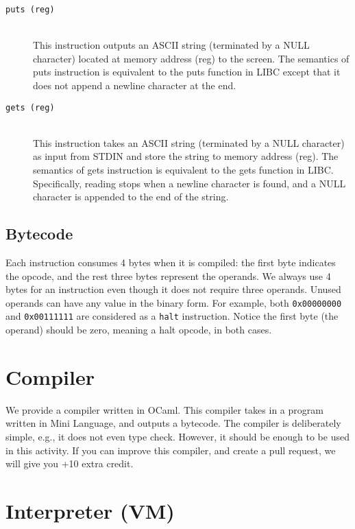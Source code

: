 \documentclass[a4paper, 11pt]{article}
\theoremstyle{definition}
\begin{document}
{\begin{description}
  \item [\texttt{puts (reg)}]~\\
    This instruction outputs an ASCII string (terminated by a NULL
    character) located at memory address (reg) to the screen. The
    semantics of puts instruction is equivalent to the puts function
    in LIBC except that it does not append a newline character at the
    end.

  \item [\texttt{gets (reg)}]~\\
    This instruction takes an ASCII string (terminated by a NULL
    character) as input from STDIN and store the string to memory
    address (reg). The semantics of gets instruction is equivalent to
    the gets function in LIBC. Specifically, reading stops when a
    newline character is found, and a NULL character is appended to
    the end of the string.

\end{description}

\subsection{Bytecode}

Each instruction consumes 4 bytes when it is compiled: the first byte
indicates the opcode, and the rest three bytes represent the operands.
We always use 4 bytes for an instruction even though it does not
require three operands. Unused operands can have any value in the
binary form. For example, both \texttt{0x00000000} and
\texttt{0x00111111} are considered as a \texttt{halt} instruction.
Notice the first byte (the operand) should be zero, meaning a halt
opcode, in both cases.

\section{Compiler}

We provide a compiler written in OCaml. This compiler takes in a
program written in Mini Language, and outputs a bytecode. The compiler
is deliberately simple, e.g., it does not even type check. However, it
should be enough to be used in this activity. If you can improve this
compiler, and create a pull request, we will give you +10 extra
credit.

\section{Interpreter (VM)}

}
\end{document}
